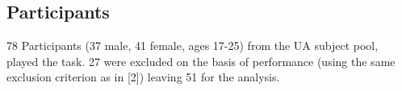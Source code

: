 \documentclass[12pt]{article}
\begin{document}
	\subsection*{Participants}
	78 Participants (37 male, 41 female, ages 17-25) from the UA subject pool, played the task.  27 were excluded on the basis of performance (using the same exclusion criterion as in [2]) leaving 51 for the analysis.
	
	
	
	
\end{document}
